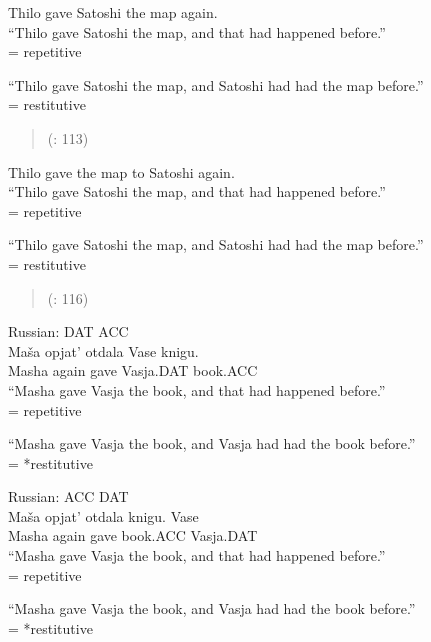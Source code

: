 \documentclass[output=paper,modfonts,nonflat,
 hidelinks
]{langsci/langscibook}
\begin{document}
 \ea\label{ex:bondarenko:}
{Thilo gave Satoshi the map again.}\\

\ea “Thilo gave Satoshi the map, and that had happened before.”\\
= {repetitive} 

\ex “Thilo gave Satoshi the map, and Satoshi had had the map      before.”\\
= {restitutive}
\z
\z

\begin{quote}
(\citealt{BeckJohnson2004}: 113)
\end{quote}

 \ea\label{ex:bondarenko:}
{Thilo gave the map to Satoshi again.}\\

\ea “Thilo gave Satoshi the map, and that had happened before.”\\
= {repetitive}

\ex “Thilo gave Satoshi the map, and Satoshi had had the map   before.”\\
= {restitutive}
\z
\z

\begin{quote}
(\citealt{BeckJohnson2004}: 116)
\end{quote}

 \ea\label{ex:bondarenko:}
{Russian: DAT ACC}\\

\gll Maša opjat’ otdala Vase knigu.\\
     Masha again gave Vasja.DAT book.ACC\\
\ea “Masha gave Vasja the book, and that had happened before.”\\
= {repetitive}

\ex *“Masha gave Vasja the book, and Vasja had had the book   before.”\\
= *{restitutive}
\z
\z

 \ea\label{ex:bondarenko:}
{Russian: ACC DAT}\\

\gll Maša opjat’ otdala knigu. Vase\\
     Masha again gave book.ACC Vasja.DAT\\
\ea “Masha gave Vasja the book, and that had happened before.”\\
= {repetitive}

\ex *“Masha gave Vasja the book, and Vasja had had the book   before.”\\
= *{restitutive}
\z
\z
\end{document}
